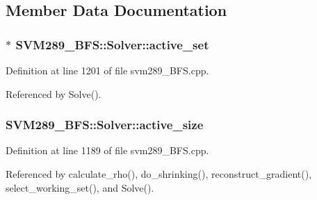 \subsection{Member Data Documentation}
\subsubsection[{\texorpdfstring{active\+\_\+set}{active_set}}]{$\ast$ S\+V\+M289\+\_\+\+B\+F\+S\+::\+Solver\+::active\+\_\+set\hspace{0.3cm}{\ttfamily [protected]}}\hypertarget{class_s_v_m289___b_f_s_1_1_solver_a30bc70bcd35e337c114d4565cbc5d19f}{}\label{class_s_v_m289___b_f_s_1_1_solver_a30bc70bcd35e337c114d4565cbc5d19f}


Definition at line 1201 of file svm289\+\_\+\+B\+F\+S.\+cpp.



Referenced by Solve().

\subsubsection[{\texorpdfstring{active\+\_\+size}{active_size}}]{ S\+V\+M289\+\_\+\+B\+F\+S\+::\+Solver\+::active\+\_\+size\hspace{0.3cm}{\ttfamily [protected]}}\hypertarget{class_s_v_m289___b_f_s_1_1_solver_a602b406f795ec9054a09d9a1ef23a8c6}{}\label{class_s_v_m289___b_f_s_1_1_solver_a602b406f795ec9054a09d9a1ef23a8c6}


Definition at line 1189 of file svm289\+\_\+\+B\+F\+S.\+cpp.



Referenced by calculate\+\_\+rho(), do\+\_\+shrinking(), reconstruct\+\_\+gradient(), select\+\_\+working\+\_\+set(), and Solve().

